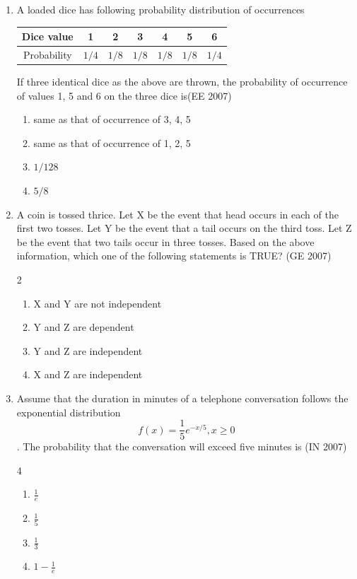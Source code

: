 \begin{enumerate}[label=\thesubsection.\arabic*,ref=\thesubsection.\theenumi]
\item  A loaded dice has following probability distribution of occurrences
%
\begin{center}
\begin{tabular}{|c|c|c|c|c|c|c|}
\hline
Dice value      & 1   & 2   & 3   & 4   & 5   & 6   \\
\hline
Probability     & $1/4$ & $1/8$ & $1/8$ & $1/8$ & $1/8$ & $1/4$ \\
\hline
\end{tabular}
\end{center}
%
If three identical dice as the above are thrown, the probability of occurrence of values 1, 5 and 6 on the three dice is\hfill{(EE 2007)} 
% 
\begin{enumerate}
    \item same as that of occurrence of 3, 4, 5
    \item same as that of occurrence of 1, 2, 5
    \item$1/128$
    \item $5/8$
\end{enumerate}
%
\item A coin is tossed thrice. Let X be the event that head occurs in each of the first two tosses.  
Let Y be the event that a tail occurs on the third toss.  
Let Z be the event that two tails occur in three tosses.  
Based on the above information, which one of the following statements is TRUE?  
\hfill (GE 2007)
\begin{multicols}{2}
\begin{enumerate}
\item X and Y are not independent  
\item Y and Z are dependent  
\item Y and Z are independent  
\item X and Z are independent  
\end{enumerate}
\end{multicols}
\item Assume that the duration in minutes of a telephone conversation follows the exponential distribution $$f(x) = \frac{1}{5} e^{-x/5}, x \geq 0$$. The probability that the conversation will exceed five minutes is  
\hfill(IN 2007)
\begin{multicols}{4}
\begin{enumerate}
\item $\frac{1}{e}$  
\item $\frac{1}{5}$  
\item $\frac{1}{3}$  
\item $1 - \frac{1}{e}$  

\end{enumerate}
\end{multicols}
\end{enumerate}
